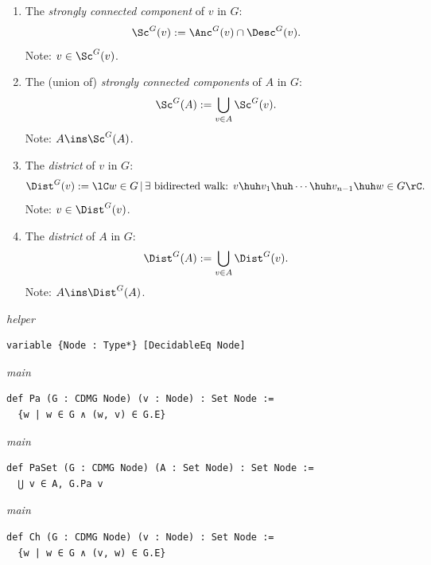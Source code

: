 {\begin{enumerate}
         \item The \emph{strongly connected component} of $v$ in $G$:
             \[ \Sc^G(v) := \Anc^G(v) \cap \Desc^G(v).\]
             Note: $v \in \Sc^G(v)$.
         \item[] The (union of) \emph{strongly connected components} of $A$ in $G$:
             \[ \Sc^G(A) := \bigcup_{v \in A} \Sc^G(v).\]
             Note: $A \ins \Sc^G(A)$.
         \item The \emph{district} of $v$ in $G$:
             \[\Dist^G(v) := \lC w \in G\,|\, \exists \text{ bidirected walk: } 
             v \huh v_1 \huh \cdots \huh v_{n-1} \huh w \in G \rC.\]
             Note: $v\in \Dist^G(v)$.
         \item[] The \emph{district} of $A$ in $G$:
             \[\Dist^G(A) := \bigcup_{v \in A} \Dist^G(v).\]
             Note: $A \ins \Dist^G(A)$.
     \end{enumerate}
\par}
\smallskip
{\small\textit{helper}}
\begin{verbatim}
variable {Node : Type*} [DecidableEq Node]
\end{verbatim}
{\small\textit{main}}
\begin{verbatim}
def Pa (G : CDMG Node) (v : Node) : Set Node :=
  {w | w ∈ G ∧ (w, v) ∈ G.E}
\end{verbatim}
{\small\textit{main}}
\begin{verbatim}
def PaSet (G : CDMG Node) (A : Set Node) : Set Node :=
  ⋃ v ∈ A, G.Pa v
\end{verbatim}
{\small\textit{main}}
\begin{verbatim}
def Ch (G : CDMG Node) (v : Node) : Set Node :=
  {w | w ∈ G ∧ (v, w) ∈ G.E}
\end{verbatim}
